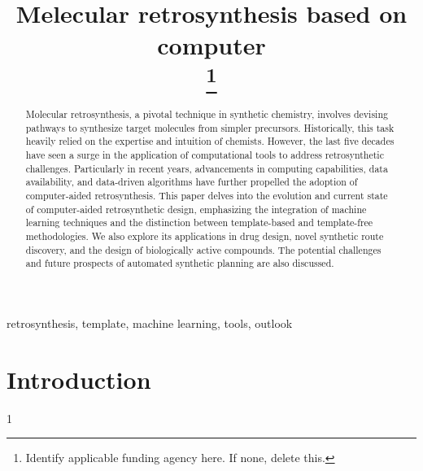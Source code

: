 \documentclass[conference]{IEEEtran}
\begin{document}
\title{Melecular retrosynthesis based on computer\\
\thanks{Identify applicable funding agency here. If none, delete this.}
}

\author{
}



\maketitle 

\begin{abstract}
Molecular retrosynthesis, a pivotal technique in synthetic chemistry, involves devising pathways to synthesize target molecules from simpler precursors\cite{label1}. Historically, this task heavily relied on the expertise and intuition of chemists. However, the last five decades have seen a surge in the application of computational tools to address retrosynthetic challenges. Particularly in recent years, advancements in computing capabilities, data availability, and data-driven algorithms have further propelled the adoption of computer-aided retrosynthesis. This paper delves into the evolution and current state of computer-aided retrosynthetic design, emphasizing the integration of machine learning techniques\cite{label2} and the distinction between template-based and template-free methodologies\cite{label3}. We also explore its applications in drug design, novel synthetic route discovery, and the design of biologically active compounds. The potential challenges and future prospects of automated synthetic planning are also discussed.
\end{abstract}

\begin{IEEEkeywords}
retrosynthesis, template, machine learning, tools, outlook
\end{IEEEkeywords}

\section{Introduction}
1 
\vspace{12pt}
\color{black}


\end{document}
